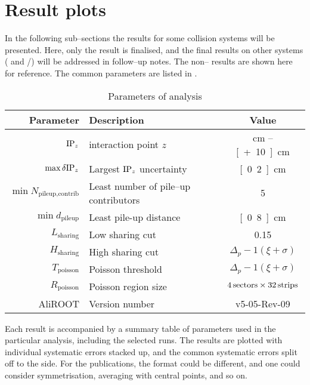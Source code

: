 \section{Result plots} 
\label{sec:results}

In the following sub--sections the \ndndeta{} results for some
collision systems will be presented.  Here, only the \PbPbCol{} result
is finalised, and the final results on other systems (\ppCol{} and
\pPbCol{}/\PbpCol{}) will be addressed in follow--up notes.  The
non--\PbPbCol{} results are shown here for reference. The common
parameters are listed in .

\begin{table}[h!tbp]
  \caption{Parameters of analysis}
  \label{tab:common:params}
  \centering
  \begin{tabular}[t]{|rlc|}
    \hline
    \headColor{} 
    \textbf{Parameter}
    & \textbf{Description}
    & \textbf{Value}\\
    \hline 
    $\IPz$ 
    & interaction point $z$ 
    & \unit[-10]{cm} -- \unit[+10]{cm}\\
    \altRowColor{}
    $\max{\delta\IPz}$ 
    & Largest $\IPz$ uncertainty 
    & \unit[0.2]{cm}\\
    $\min{N_{\text{pileup,contrib}}}$ 
    & Least number of pile--up contributors 
    & 5\\
    \altRowColor{}
    $\min{d_{\text{pileup}}}$ 
    & Least pile-up distance 
    & \unit[0.8]{cm}\\
    \hline 
    $L_{\text{sharing}}$ 
    & Low sharing cut 
    & 0.15\\
    \altRowColor{}
    $H_{\text{sharing}}$ 
    & High sharing cut 
    & $\Delta_p-1(\xi+\sigma)$ \\
    $T_{\text{poisson}}$ 
    & Poisson threshold 
    & $\Delta_p-1(\xi+\sigma)$ \\
    \altRowColor{}
    $R_{\text{poisson}}$ 
    & Poisson region size 
    & $\unit[4]{sectors} \times \unit[32]{strips}$\\
    \hline 
    \textsf{AliROOT} 
    & Version number 
    & v5-05-Rev-09\\
    \hline
  \end{tabular}
\end{table}


Each result is accompanied by a summary table of parameters used in
the particular analysis, including the selected runs.  The results are
plotted with individual systematic errors stacked up, and the common
systematic errors split off to the side.  For the publications, the
format could be different, and one could consider symmetrisation,
averaging with central points, and so on.


